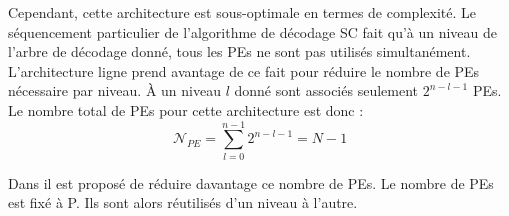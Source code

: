 Cependant, cette architecture est sous-optimale en termes de complexité. Le séquencement particulier de l'algorithme de décodage SC fait qu'à un niveau de l'arbre de décodage donné, tous les PEs ne sont pas utilisés simultanément. L'architecture \og ligne \fg prend avantage de ce fait pour réduire le nombre de PEs nécessaire par niveau. \`A un niveau $l$ donné sont associés seulement $2^{n-l-1}$ PEs. Le nombre total de PEs pour cette architecture est donc : 
\begin{equation*}
\mathcal{N}_{PE} = \displaystyle\sum_{l=0}^{n-1} 2^{n-l-1} = N-1
\end{equation*}

Dans \cite{leroux_semi-parallel_2013} il est proposé de réduire davantage ce nombre de PEs. Le nombre de PEs est fixé à P. Ils sont alors réutilisés d'un niveau à l'autre.


